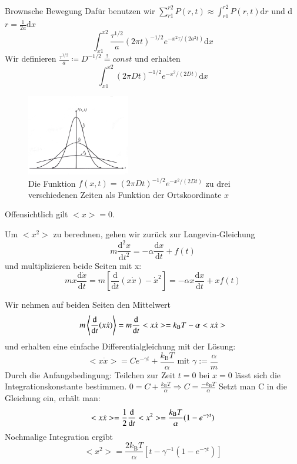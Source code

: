 \documentclass[ngerman]{article}
\begin{document}
\begin{section}{Brownsche Bewegung}
Dafür benutzen wir $\sum_{r1}^{r2}P(r, t)\approx \int_{r1}^{r2}P(r, t)\text{d}r$ und d$r=\frac{1}{2a}\text{d}x$
$$ \int_{x1}^{x2}\frac{\tau^{1/2}}{a}(2\pi t)^{-1/2}e^{-x^2\tau/(2a^2t)}\text{d}x$$
Wir definieren $\frac{\tau^{1/2}}{a}\coloneqq D^{-1/2}  \stackrel{!}{=} const$ und erhalten $$\int_{x1}^{x2} (2\pi Dt)^{-1/2}e^{-x^2/(2Dt)}\text{d}x$$

\begin{figure}[h]
\includegraphics[width=4.5cm]{verteilung.JPG}
\caption{Die Funktion $f(x,t)= (2\pi Dt)^{-1/2}e^{-x^2/(2Dt)}$ zu drei verschiedenen Zeiten als Funktion der Ortskoordinate $x$}
\end{figure}



Offensichtlich gilt $<x>=0$. 

Um $<x^2>$ zu berechnen, gehen wir zurück zur Langevin-Gleichung
$$m\frac{\text{d}^{2}{x}}{\text{d}t^{2}}=-\alpha \frac{\text{d}{x}}{\text{d}t}  + f(t)$$ und multiplizieren beide Seiten mit x:
$$mx\frac{\text{d}{\dot x}}{\text{d}t}=m\left[\frac{\text{d}}{\text{d}t}(x\dot x)-\dot x^2\right]=-\alpha x \frac{\text{d}{x}}{\text{d}t}  + x f(t)$$





Wir nehmen auf beiden Seiten den Mittelwert
$$m\left< \frac{\text{d}}{\text{d}t}(x\dot x)\right>=m\frac{\text d}{\text d t}<x\dot x>=k_{\mathrm{B}}T-\alpha <x\dot x>$$ und erhalten eine einfache Differentialgleichung mit der Lösung: $$<x\dot x> = Ce^{-\gamma t}+\frac{k_{\mathrm B}T}{\alpha}     \text{    \            \                   mit } \gamma :=\frac{\alpha}{m}$$Durch die Anfangsbedingung: Teilchen zur Zeit $t=0$ bei $x=0$ lässt sich die Integrationskonstante bestimmen. $ 0=C+\frac{k_{\mathrm B}T}{\alpha} \Rightarrow C=\frac{-k_{\mathrm B}T}{\alpha}$ Setzt man C in die Gleichung ein, erhält man:
$$<x\dot x> =\frac{1}{2} \frac{\text d}{\text d t}<x^2>= \frac{k_{\mathrm B}T}{\alpha} (1-e^{-\gamma t})$$ Nochmalige Integration ergibt 
$$<x^2>=\frac{2k_{\mathrm B}T}{\alpha}[t-\gamma^{-1}(1-e^{-\gamma t})]$$





\end{section}
\end{document}
